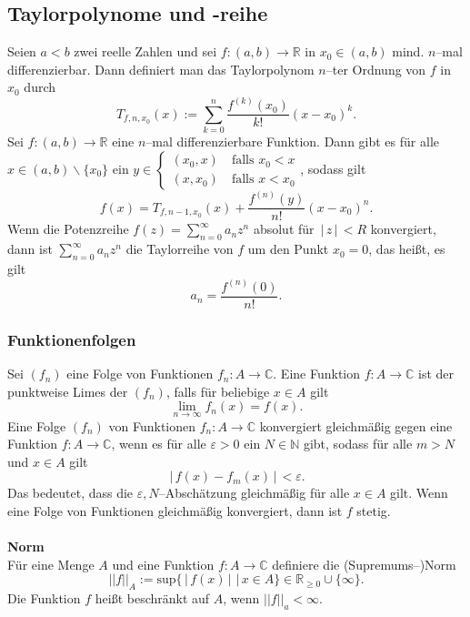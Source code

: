 \documentclass[a4paper,12pt]{article}
\numberwithin{equation}{section}
\begin{document}
\subsection{Taylorpolynome und -reihe}
Seien $a<b$ zwei reelle Zahlen und sei $f:\left(a,b\right)\rightarrow \mathbb{R}$ in $x_0 \in \left(a,b\right)$ mind. $n$--mal differenzierbar. Dann definiert man das Taylorpolynom $n$--ter Ordnung von $f$ in $x_0$ durch
\[ 
        T_{f,n,x_0}\left(x\right):=\sum_{k=0}^{n}\dfrac{f^{\left(k\right)}\left(x_0\right)}{k!}\left(x-x_0\right)^{k}
.\] 
Sei $f:\left(a,b\right)\rightarrow \mathbb{R}$ eine $n$--mal differenzierbare Funktion. Dann gibt es für alle $x \in \left(a,b\right)\backslash\{x_0\}$ ein $y \in \begin{cases} %
        \left(x_0,x\right)\quad \text{falls $x_0<x$}\\
        \left(x,x_0\right)\quad \text{falls $x<x_0$}
\end{cases}$, sodass gilt
\[ 
        f\left(x\right)=T_{f,n-1,x_0}\left(x\right)+\dfrac{f^{\left(n\right)}\left(y\right)}{n!}\left(x-x_0\right)^{n}
.\] 
Wenn die Potenzreihe $f\left(z\right)=\sum_{n=0}^{\infty}a_nz^n$ absolut für $\,|\, z\,|\, <R$ konvergiert, dann ist $\sum_{n=0}^{\infty}a_nz^n$ die Taylorreihe von $f$ um den Punkt $x_0=0$, das heißt, es gilt
\[ 
        a_n=\dfrac{f^{\left(n\right)}\left(0\right)}{n!}
.\] 

\subsubsection{Funktionenfolgen}
Sei $\left(f_n\right)$ eine Folge von Funktionen $f_n:A\rightarrow \mathbb{C}$. Eine Funktion $f:A\rightarrow \mathbb{C}$ ist der punktweise Limes der $\left(f_n\right)$, falls für beliebige $x \in A$ gilt
\[ 
        \lim_{n\rightarrow \infty}f_n\left(x\right)=f\left(x\right)
.\] 
Eine Folge $\left(f_n\right)$ von Funktionen $f_n:A\rightarrow \mathbb{C}$ konvergiert gleichmäßig gegen eine Funktion $f:A\rightarrow \mathbb{C}$, wenn es für alle $\varepsilon >0$ ein $N \in \mathbb{N}$ gibt, sodass für alle $m>N$ und $x \in A$ gilt
\[ 
        \,|\, f\left(x\right)-f_m\left(x\right)\,|\, <\varepsilon 
.\] 
Das bedeutet, dass die $\varepsilon ,N$--Abschätzung \glqq gleichmäßig\grqq{} für alle $x \in A$ gilt. Wenn eine Folge von Funktionen gleichmäßig konvergiert, dann ist $f$ stetig.
\\\hfill\\\textbf{Norm}\\ 
Für eine Menge $A$ und eine Funktion $f:A\rightarrow \mathbb{C}$ definiere die (Supremums--)Norm
\[ 
        ||f||_A:=\text{sup}\{\,|\, f\left(x\right)\,|\, \,|\, x \in A\} \in \mathbb{R}_{\geq 0}\cup \{\infty\}
.\] 
Die Funktion $f$ heißt beschränkt auf $A$, wenn $||f||_a<\infty$. 
\end{document}
